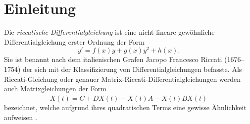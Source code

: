 \section{Einleitung} \label{kra:section:einleitung}
Die {\em riccatische Differentialgleichung} ist eine nicht lineare
%
gewöhnliche Differentialgleichung erster Ordnung der Form
\begin{equation}
    \label{kra:equation:riccati}
    y' = f(x)y + g(x)y^2 + h(x).
\end{equation}
Sie ist benannt nach dem italienischen Grafen Jacopo Francesco
Riccati (1676--1754) der sich mit der Klassifizierung von
%
%
Differentialgleichungen befasste.
Als Riccati-Gleichung oder genauer Matrix-Riccati-Differentialgleichungen
werden auch Matrixgleichungen der Form
\begin{equation}
    \label{kra:equation:matrixriccati}
    \dot{X}(t) = C + DX(t) - X(t)A -X(t)BX(t)
\end{equation}
bezeichnet, welche aufgrund ihres quadratischen Terms eine gewisse
Ähnlichkeit aufweisen \cite{kra:riccati,kra:ethz}.

